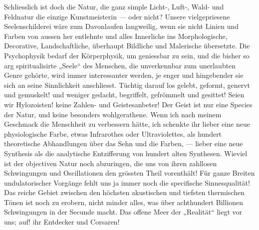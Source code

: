 Schliesslich ist doch die Natur, die ganz simple Licht-, Luft-, Wald- und Feldnatur die einzige Kunstmeisterin — oder nicht? Unsere vielgepriesene Seelenschilderei wäre zum Davonlaufen langweilig, wenn sie nicht Linien und Farben von aussen her entlehnte und alles Innerliche ins Morphologische, Decorative, Landschaftliche, überhaupt Bildliche und Malerische übersetzte. Die Psychophysik bedarf der Körperphysik, um geniessbar zu sein, und die bisher so arg spiritualisirte „Seele“ des Menschen, die unverkennbar zum unerlaubten Genre gehörte, wird immer interessanter werden, je enger und hingebender sie sich an seine Sinnlichkeit anschliesst. Tüchtig darauf los gelebt, geformt, genervt und gemuskelt! und weniger gedacht, begriffelt, gefrömmelt und gesittet! Seien wir Hylozoisten! keine Zahlen- und Geistesanbeter! Der Geist ist nur eine Species der Natur, und keine besonders wohlgerathene. Wenn ich nach meinem Geschmack die Menschheit zu verbessern hätte, ich schenkte ihr lieber eine neue physiologische Farbe, etwas Infrarothes oder Ultraviolettes, als hundert theoretische Abhandlungen über das Sehn und die Farben, — lieber eine neue Synthesis als die analytische Entzifferung von hundert alten Synthesen. Wieviel ist der objectiven Natur noch abzuringen, die uns von ihren zahllosen Schwingungen und Oscillationen den grössten Theil vorenthält! Für ganze Breiten undulatorischer Vorgänge fehlt uns ja immer noch die specifische Sinnesqualität! Das reiche Gebiet zwischen den höchsten akustischen und tiefsten thermischen Tönen ist noch zu erobern, nicht minder alles, was über achthundert Billionen Schwingungen in der Secunde macht. Das offene Meer der „Realität“ liegt vor uns; auf! ihr Entdecker und Corsaren!
\par

